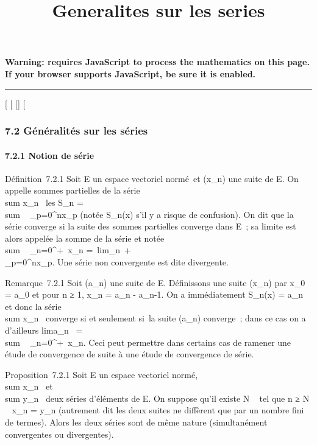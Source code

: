 \documentclass[]{article}
\title{Generalites sur les series}
\author{}
\date{}
\begin{document}
\maketitle

\textbf{Warning: 
requires JavaScript to process the mathematics on this page.\\ If your
browser supports JavaScript, be sure it is enabled.}

\begin{center}\rule{3in}{0.4pt}\end{center}

[
[
[]
[

\subsubsection{7.2 Généralités sur les séries}

\paragraph{7.2.1 Notion de série}

Définition~7.2.1 Soit E un espace vectoriel normé~et (x_n) une
suite de E. On appelle sommes partielles de la série
\\sum  x_n~ les
S_n = \\sum ~
_p=0^nx_p (notée S_n(x) s'il y a risque
de confusion). On dit que la série converge si la suite des sommes
partielles converge dans E~; sa limite est alors appelée la somme de la
série et notée \\sum ~
_n=0^+\infty~x_n =\
lim_n\rightarrow~+\infty~\\\sum
 _p=0^nx_p. Une série non convergente est
dite divergente.

Remarque~7.2.1 Soit (a_n) une suite de E. Définissons une suite
(x_n) par x_0 = a_0 et pour n ≥ 1,
x_n = a_n - a_n-1. On a immédiatement
S_n(x) = a_n et donc la série
\\sum  x_n~
converge si et seulement si~la suite (a_n) converge~; dans ce
cas on a d'ailleurs lima_n~
= \\sum ~
_n=0^+\infty~x_n. Ceci peut permettre dans certains cas
de ramener une étude de convergence de suite à une étude de convergence
de série.

Proposition~7.2.1 Soit E un espace vectoriel normé,
\\sum  x_n~ et
\\sum  y_n~ deux
séries d'éléments de E. On suppose qu'il existe N \in {}~ tel que n ≥ N \rigtharrow~
x_n = y_n (autrement dit les deux suites ne diffèrent
que par un nombre fini de termes). Alors les deux séries sont de même
nature (simultanément convergentes ou divergentes).
\end{document}

